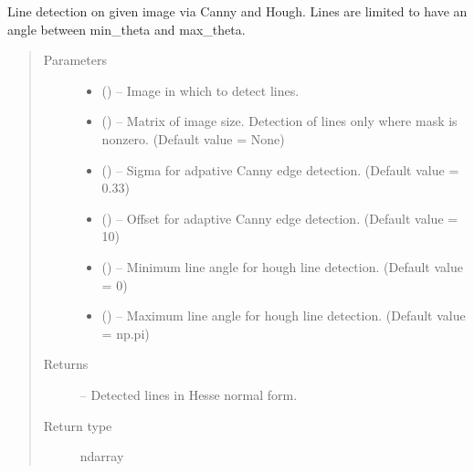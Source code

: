 \documentclass[letterpaper,10pt,english]{sphinxmanual}
\begin{document}
\begin{fulllineitems}
\label{\detokenize{image_lines:image_lines.line_detect}}
Line detection on given image via Canny and Hough.
Lines are limited to have an angle between min\_theta and max\_theta.
\begin{quote}\begin{description}
\item[{Parameters}] \leavevmode\begin{itemize}
\item {} 
 () -- Image in which to detect lines.

\item {} 
 () -- Matrix of image size. Detection of lines only where mask is
nonzero. (Default value = None)

\item {} 
 () -- Sigma for adpative Canny edge detection. (Default value = 0.33)

\item {} 
 () -- Offset for adaptive Canny edge detection. (Default value = 10)

\item {} 
 () -- Minimum line angle for hough line detection.
(Default value = 0)

\item {} 
 () -- Maximum line angle for hough line detection.
(Default value = np.pi)

\end{itemize}

\item[{Returns}] \leavevmode
{} -- Detected lines in Hesse normal form.

\item[{Return type}] \leavevmode
ndarray

\end{description}\end{quote}

\end{fulllineitems}
\end{document}
